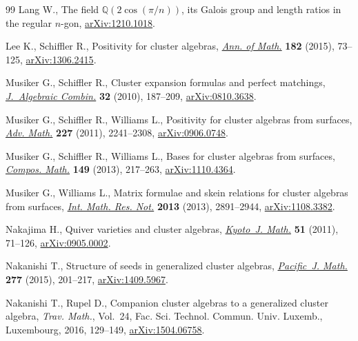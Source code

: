 \documentclass[pdftex]{sigma}%
\numberwithin{equation}{section}
\begin{document}
\begin{thebibliography}{99}
Lang W., The field $\mathbb{Q}(2\cos(\pi/n))$, its Galois group and length
 ratios in the regular $n$-gon, \href{https://arxiv.org/abs/1210.1018}{arXiv:1210.1018}.

Lee K., Schiffler R., Positivity for cluster algebras, \href{https://doi.org/10.4007/annals.2015.182.1.2}{\textit{Ann. of Math.}}
 \textbf{182} (2015), 73--125, \href{https://arxiv.org/abs/1306.2415}{arXiv:1306.2415}.

Musiker G., Schiffler R., Cluster expansion formulas and perfect matchings,
 \href{https://doi.org/10.1007/s10801-009-0210-3}{\textit{J.~Algebraic Combin.}} \textbf{32} (2010), 187--209,
 \href{https://arxiv.org/abs/0810.3638}{arXiv:0810.3638}.

Musiker G., Schiffler R., Williams L., Positivity for cluster algebras from
 surfaces, \href{https://doi.org/10.1016/j.aim.2011.04.018}{\textit{Adv. Math.}} \textbf{227} (2011), 2241--2308,
 \href{https://arxiv.org/abs/0906.0748}{arXiv:0906.0748}.

Musiker G., Schiffler R., Williams L., Bases for cluster algebras from
 surfaces, \href{https://doi.org/10.1112/S0010437X12000450}{\textit{Compos. Math.}} \textbf{149} (2013), 217--263,
 \href{https://arxiv.org/abs/1110.4364}{arXiv:1110.4364}.

Musiker G., Williams L., Matrix formulae and skein relations for cluster
 algebras from surfaces, \href{https://doi.org/10.1093/imrn/rns118}{\textit{Int. Math. Res. Not.}} \textbf{2013} (2013),
 2891--2944, \href{https://arxiv.org/abs/1108.3382}{arXiv:1108.3382}.

Nakajima H., Quiver varieties and cluster algebras, \href{https://doi.org/10.1215/0023608X-2010-021}{\textit{Kyoto~J. Math.}}
 \textbf{51} (2011), 71--126, \href{https://arxiv.org/abs/0905.0002}{arXiv:0905.0002}.

Nakanishi T., Structure of seeds in generalized cluster algebras,
 \href{https://doi.org/10.2140/pjm.2015.277.201}{\textit{Pacific~J. Math.}} \textbf{277} (2015), 201--217, \href{https://arxiv.org/abs/1409.5967}{arXiv:1409.5967}.

Nakanishi T., Rupel D., Companion cluster algebras to a generalized cluster
 algebra, \textit{Trav. Math.}, Vol.~24, Fac. Sci. Technol. Commun. Univ. Luxemb., Luxembourg, 2016,
 129--149, \href{https://arxiv.org/abs/1504.06758}{arXiv:1504.06758}.


\end{thebibliography}
\end{document}
